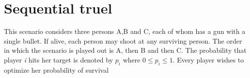 \documentclass[a4paper, 11pt]{article}
\begin{document}
\section{Sequential truel}

This scenario considers three persons A,B and C, each of whom has a gun with a single bullet. If alive, each person may shoot at any surviving person. The order in which the scenario is played out is A, then B and then C. The probability that player \textit{i} hits her target is denoted by $p_i$ where $0\leq p_i\leq 1$. Every player wishes to optimize her probability of survival


\newpage



\end{document}
